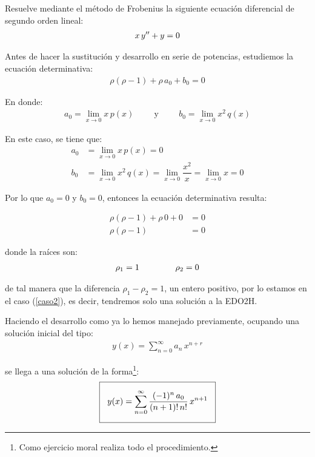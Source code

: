 Resuelve mediante el método de Frobenius la siguiente ecuación diferencial de segundo orden lineal:
\begin{align*}
x \, {y}^{\prime \prime} + y = 0
\end{align*}

Antes de hacer la sustitución y desarrollo en serie de potencias, estudiemos la ecuación determinativa:
\begin{align*}
\rho (\rho - 1) + \rho \, a_{0} + b_{0} = 0
\end{align*}

En donde:
\begin{align*}
a_{0} = \lim_{x \to 0} x \, p(x) \hspace{1cm} \mbox{y} \hspace{1cm} b_{0} = \lim_{x \to 0} x^{2} \, q(x)
\end{align*}

En este caso, se tiene que:
\begin{align*}
a_{0} &= \lim_{x \to 0} x \, p(x) = 0 \\[1em]
b_{0} &= \lim_{x \to 0} x^{2} \, q(x) = \lim_{x \to 0} \dfrac{x^{2}}{x} = \lim_{x \to 0} x = 0
\end{align*}

Por lo que $a_{0} = 0$ y $b_{0} = 0$, entonces la ecuación determinativa resulta:

\begin{align*}
\rho (\rho - 1) + \rho \, 0 + 0 &= 0 \\[1em]
\rho (\rho - 1) &= 0 
\end{align*}

donde la raíces son:
\begin{align*}
\rho_{1} = 1 \hspace{1.5cm} \rho_{2} = 0
\end{align*}

de tal manera que la diferencia $\rho_{1} - \rho_{2} = 1$, un entero positivo, por lo estamos en el caso (\ref{caso2}), es decir, tendremos solo una solución a la EDO2H.
\par
Haciendo el desarrollo como ya lo hemos manejado previamente, ocupando una solución inicial del tipo:
\begin{align*}
y(x) = \sum_{n=0}^{\infty} a_{n} \, x^{n+r}
\end{align*}

se llega a una solución de la forma\footnote{Como ejercicio moral realiza todo el procedimiento.}:
\begin{align}
\setlength{\fboxsep}{3\fboxsep}\boxed{
y(x) = \sum_{n=0}^{\infty} \dfrac{(-1)^{n} \, a_{0}}{(n + 1)! \, n!} \, x^{n+1}}
\label{eq:ecuacion_sol}
\end{align}

